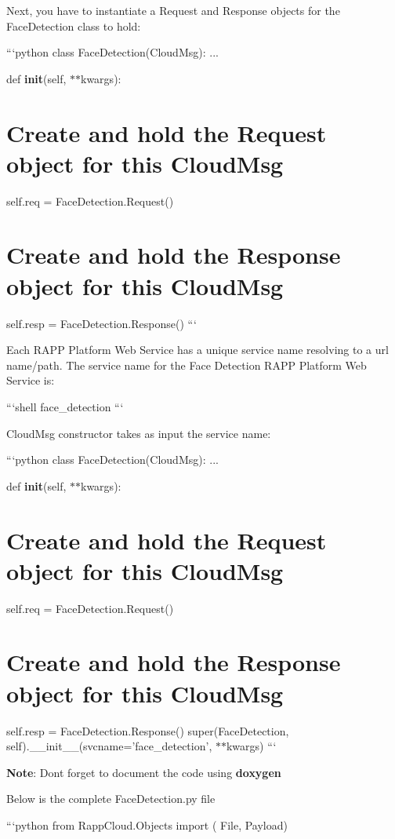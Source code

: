 Next, you have to instantiate a {\ttfamily Request} and {\ttfamily Response} objects for the {\ttfamily Face\-Detection} class to hold\-:

```python class Face\-Detection(\-Cloud\-Msg)\-: ...

def {\bfseries init}(self, $\ast$$\ast$kwargs)\-: \section*{Create and hold the Request object for this Cloud\-Msg}

self.\-req = Face\-Detection.\-Request() \section*{Create and hold the Response object for this Cloud\-Msg}

self.\-resp = Face\-Detection.\-Response() ```

Each R\-A\-P\-P Platform Web Service has a unique service name resolving to a url name/path. The service name for the Face Detection R\-A\-P\-P Platform Web Service is\-:

```shell face\-\_\-detection ```

{\ttfamily Cloud\-Msg} constructor takes as input the service name\-:

```python class Face\-Detection(\-Cloud\-Msg)\-: ...

def {\bfseries init}(self, $\ast$$\ast$kwargs)\-: \section*{Create and hold the Request object for this Cloud\-Msg}

self.\-req = Face\-Detection.\-Request() \section*{Create and hold the Response object for this Cloud\-Msg}

self.\-resp = Face\-Detection.\-Response() super(\-Face\-Detection, self).\-\_\-\-\_\-init\-\_\-\-\_\-(svcname='face\-\_\-detection', $\ast$$\ast$kwargs) ```

{\bfseries Note}\-: Dont forget to document the code using {\bfseries doxygen}

Below is the complete Face\-Detection.\-py file

```python from Rapp\-Cloud.\-Objects import ( File, Payload)

